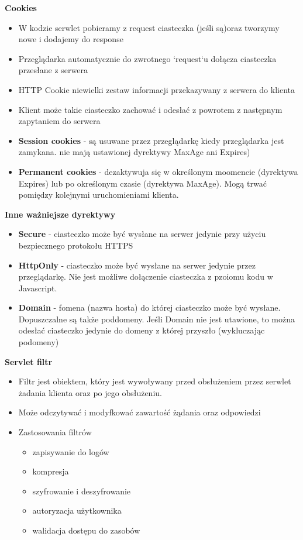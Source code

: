 \documentclass[../main.tex]{subfiles}
\begin{document}
    \textbf{Cookies}
    \begin{itemize}
        \item W kodzie serwlet pobieramy z request ciasteczka (jeśli są)oraz tworzymy nowe i dodajemy do response
        \item Przeglądarka automatycznie do zwrotnego `request`u dołącza ciasteczka
        przesłane z serwera
        \item HTTP Cookie niewielki zestaw informacji przekazywany z serwera do klienta
        \item Klient może takie ciasteczko zachować i odesłać z powrotem z następnym
        zapytaniem do serwera
        \item \textbf{Session cookies} - są usuwane przez przeglądarkę kiedy przeglądarka jest zamykana. nie mają
        ustawionej dyrektywy MaxAge ani Expires)
        \item \textbf{Permanent cookies} - dezaktywuja się w określonym moomencie (dyrektywa Expires) lub po
        określonym czasie (dyrektywa MaxAge). Mogą trwać pomiędzy kolejnymi
        uruchomieniami klienta.
    \end{itemize}

    \textbf{Inne ważniejsze dyrektywy}
    \begin{itemize}
        \item \textbf{Secure} - ciasteczko może być wysłane na serwer jedynie przy użyciu bezpiecznego
        protokołu HTTPS
        \item \textbf{HttpOnly} - ciasteczko może być wysłane na serwer jedynie przez przeglądarkę. Nie jest
        możliwe dołączenie ciasteczka z pzoiomu kodu w Javascript.
        \item \textbf{Domain} - fomena (nazwa hosta) do której ciasteczko może być wysłane.
        Dopuszczalne są także poddomeny. Jeśli Domain nie jest utawione, to można odesłać ciasteczko jedynie do
        domeny z której przyszło (wykluczając podomeny)
    \end{itemize}

    \textbf{Servlet filtr}
    \begin{itemize}
        \item Filtr jest obiektem, który jest wywoływany przed obsłużeniem przez serwlet żadania klienta oraz po jego obsłużeniu.
        \item Może odczytywać i modyfkować zawartość żądania oraz odpowiedzi
        \item Zastosowania filtrów
        \begin{itemize}
            \item zapisywanie do logów
            \item kompresja
            \item szyfrowanie i deszyfrowanie
            \item autoryzacja użytkownika
            \item walidacja dostępu do zasobów
        \end{itemize}
    \end{itemize}
\end{document}

